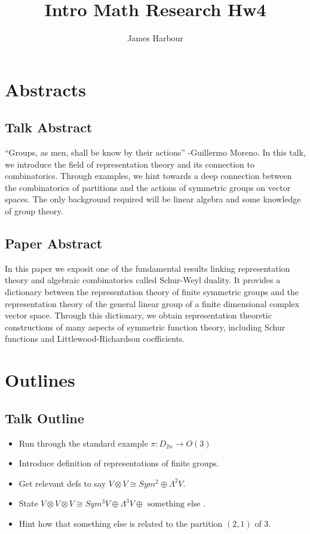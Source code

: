 \documentclass[12pt]{article}
\title{Intro Math Research Hw4}
\author{James Harbour}
\begin{document}
\maketitle


\section{Abstracts}

\subsection*{Talk Abstract}
``Groups, as men, shall be know by their actions'' -Guillermo Moreno. In this talk, we introduce the field of representation theory and its connection to combinatorics. Through examples, we hint towards a deep connection between the combinatorics of partitions and the actions of symmetric groups on vector spaces. The only background required will be linear algebra and some knowledge of group theory.


\subsection*{Paper Abstract}

In this paper we exposit one of the fundamental results linking representation theory and algebraic combinatorics called Schur-Weyl duality. It provides a dictionary between the representation theory of finite symmetric groups and the representation theory of the general linear group of a finite dimensional complex vector space. Through this dictionary, we obtain representation theoretic constructions of many aspects of symmetric function theory, including Schur functions and Littlewood-Richardson coefficients.

\newpage
\section{Outlines}

\subsection{Talk Outline}
\begin{itemize}
  \item Run through the standard example $ \pi:  D_{2n} \to O(3) $
  \item Introduce definition of representations of finite groups.
  \item Get relevant defs to say $ V\otimes V \cong Sym^{2} \oplus \Lambda^{2}V$.
  \item State $ V\otimes V\otimes V \cong Sym^{3}V \oplus \Lambda^{3}V \oplus \text{ something else }$.
  \item Hint how that something else is related to the partition $ (2,1) $ of $ 3 $.
\end{itemize}
\end{document}

